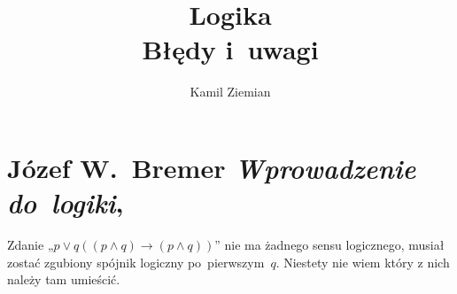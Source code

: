 \documentclass[a4paper,11pt]{article}
\title{Logika \\
  {\Large Błędy i~uwagi}}
\author{Kamil Ziemian}
\numberwithin{equation}{section}
\begin{document}





\maketitle





\section{Józef W.~Bremer \textit{Wprowadzenie do~logiki},
  \cite{Bremer-Wprowadzenie-do-logiki-Pub-2004}}






\noindent
{} Zdanie „$p \vee q ( ( p \land q ) \to ( p \land q ) )$” nie ma
żadnego sensu logicznego, musiał zostać zgubiony spójnik logiczny
po~pierwszym~$q$. Niestety nie wiem który z nich należy tam umieścić.





\end{document}
